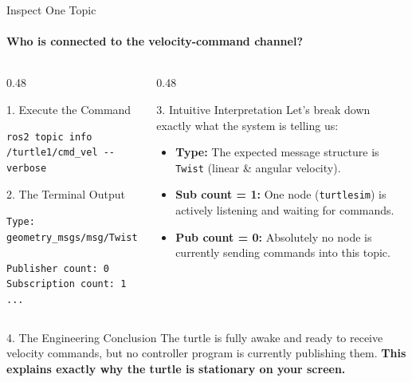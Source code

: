 \begin{frame}[fragile]{Inspect One Topic}
\framesubtitle{Who is connected to the velocity-command channel?}

\footnotesize

\begin{columns}[T,onlytextwidth]

    \begin{column}{0.48\textwidth}
        \begin{block}{1. Execute the Command}
\begin{verbatim}
ros2 topic info /turtle1/cmd_vel --verbose
\end{verbatim}
        \end{block}

        \begin{exampleblock}{2. The Terminal Output}
\begin{verbatim}
Type: geometry_msgs/msg/Twist

Publisher count: 0
Subscription count: 1
...
\end{verbatim}
        \end{exampleblock}
    \end{column}

    \begin{column}{0.48\textwidth}
        \begin{block}{3. Intuitive Interpretation}
            Let's break down exactly what the system is telling us:
            \begin{itemize}
                \setlength{\itemsep}{0.3em}
                \item \textbf{Type:} The expected message structure is \texttt{Twist} (linear \& angular velocity).
                \item \textbf{Sub count = 1:} One node (\texttt{turtlesim}) is actively listening and waiting for commands.
                \item \textbf{Pub count = 0:} Absolutely no node is currently sending commands into this topic.
            \end{itemize}
        \end{block}
    \end{column}

\end{columns}

        \vspace{0.1cm}

        \begin{alertblock}{4. The Engineering Conclusion}
            The turtle is fully awake and ready to receive velocity commands, but no controller program is currently publishing them. \textbf{This explains exactly why the turtle is stationary on your screen.}
        \end{alertblock}
\end{frame}

